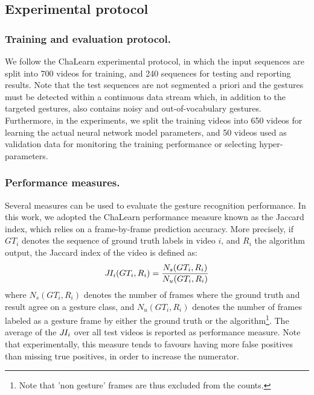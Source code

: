 \subsection{Experimental protocol}

\subsubsection{Training and evaluation protocol.}

We follow the ChaLearn experimental protocol, in which the input sequences are split into 700 videos for training, and 240 sequences for testing and reporting results.
Note that the   test sequences  are not segmented a priori and the gestures must be detected within a continuous data stream
which, in addition to the targeted gestures, also contains noisy and out-of-vocabulary gestures.
%
Furthermore, in the experiments, we split the training videos into 650 videos for learning the actual neural network model parameters, and 50 videos
used as validation data for monitoring the training performance or selecting hyper-parameters.


\subsubsection{Performance measures.}

Several measures can be used to evaluate the gesture recognition performance.
%
In this work, we adopted the ChaLearn performance measure known as the Jaccard index, which relies on a frame-by-frame prediction accuracy.
More precisely, if $GT_i$ denotes the sequence of ground truth labels in video $i$, and $R_i$ the algorithm output, the Jaccard index
of the video is defined as:
\begin{equation}
J\hspace*{-0.1em}I_i(GT_i, R_i) = \frac{N_s(GT_i, R_i)}{N_u(GT_i, R_i)}
\end{equation}
where $N_s(GT_i, R_i)$ denotes the number of frames where the ground truth and result agree on a gesture class,
and $N_u(GT_i, R_i)$ denotes the number of frames labeled as a gesture frame by  either the ground truth or the algorithm\footnote{Note that 'non gesture'
frames are thus excluded from the counts.}. The average of the $J\hspace*{-0.1em}I_i$ over all test videos is reported as performance measure.
%
Note that experimentally, this measure tends to favours having more false positives than missing true positives, in order to increase the numerator.

